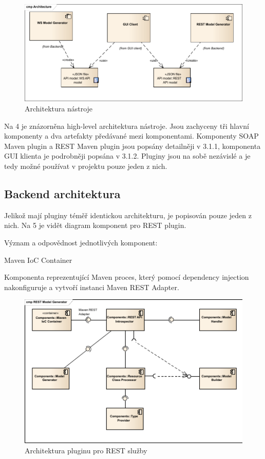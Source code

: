 \documentclass[11pt,twoside,a4paper]{book}
\begin{document}
\begin{figure}[h]
\begin{center}
\includegraphics[width=13cm]{images-pdf/Architecture.pdf}
\caption{Architektura nástroje}
\label{fig:logo}
\end{center}
\end{figure}

Na 4 je znázorněna high-level architektura nástroje. Jsou zachyceny tři hlavní komponenty a
dva artefakty předávané mezi komponentami. Komponenty SOAP Maven plugin a REST
Maven plugin jsou popsány detailněji v 3.1.1, komponenta GUI klienta je podrobněji popsána
v 3.1.2. Pluginy jsou na sobě nezávislé a je tedy možné používat v projektu pouze jeden z
nich.

\subsection{Backend architektura}

Jelikož mají pluginy téměř identickou architekturu, je popisován pouze jeden z nich. Na 5 je
vidět diagram komponent pro REST plugin.

Význam a odpovědnost jednotlivých komponent:

Maven IoC Container

Komponenta reprezentující Maven proces, který pomocí dependency injection nakonfiguruje
a vytvoří instanci Maven REST Adapter.

\begin{figure}[h]
\begin{center}
\includegraphics[width=13cm]{images-pdf/REST Model Generator.pdf}
\caption{Architektura pluginu pro REST služby}
\label{fig:logo}
\end{center}
\end{figure}
\end{document}
